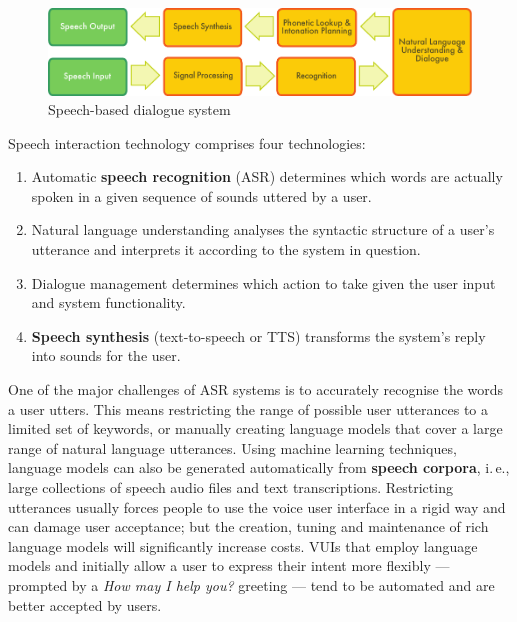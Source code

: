 \documentclass[]{../../metanetpaper}
\begin{document}
\begin{multicols}{2}
\begin{figure}[htb]
  \center
  \includegraphics[width=\textwidth]{../_media/english/simple_speech-based_dialogue_architecture}
  \caption{Speech-based dialogue system}
  \label{fig:dialoguearch_en}
\end{figure}

Speech interaction technology comprises four technologies: 

\begin{enumerate}
\item Automatic \textbf{speech recognition} (ASR) determines which words are actually spoken in a given sequence of sounds uttered by a user.  
\item Natural language understanding analyses the syntactic structure of a user’s utterance and interprets it according to the system in question.
\item Dialogue management determines which action to take given the user input and system functionality.   
\item \textbf{Speech synthesis} (text-to-speech or TTS) transforms the system’s reply into sounds for the user.
\end{enumerate}

One of the major challenges of ASR systems is to accurately recognise the words a user utters. This means restricting the range of possible user utterances to a limited set of keywords, or manually creating language models that cover a large range of natural language utterances. Using machine learning techniques, language models can also be generated automatically from \textbf{speech corpora}, i.\,e., large collections of speech audio files and text transcriptions. Restricting utterances usually forces people to use the voice user interface in a rigid way and can damage user acceptance; but the creation, tuning and maintenance of rich language models will significantly increase costs. VUIs that employ language models and initially allow a user to express their intent more flexibly — prompted by a \textit{How may I help you?} greeting — tend to be automated and are better accepted by users.


\end{multicols}
\end{document}
